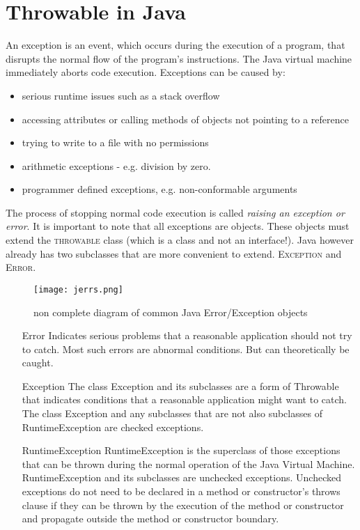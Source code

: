 \documentclass{scrartcl}
\title{\titleVar}
\begin{document}
\maketitle

\thispagestyle{fancy}

\section{Throwable in Java}

An exception is an event, which occurs during the execution of a program, that disrupts the normal flow of the program's instructions. The Java virtual machine immediately aborts code execution. Exceptions can be caused by:
\begin{itemize}
    \item serious runtime issues such as a stack overflow
    \item accessing attributes or calling methods of objects not pointing to a reference
    \item trying to write to a file with no permissions
    \item arithmetic exceptions - e.g. division by zero.
    \item programmer defined exceptions, e.g. non-conformable arguments
\end{itemize}

The process of stopping normal code execution is called  \textit{raising an exception or error}. It is important to note that all exceptions are objects. These objects must extend the \textsc{throwable} class  (which is a class and not an interface!). Java however already has two subclasses that are more convenient to extend. \textsc{Exception} and \textsc{Error}.


\begin{figure}[!h]
  \centering
\texttt{[image: jerrs.png]}
  \caption{non complete diagram of common Java Error/Exception objects}
\end{figure}
\begin{itemize}
    \item[Error] Indicates serious problems that a reasonable application should not try to catch. Most such errors are abnormal conditions. But can theoretically be caught.
    \item[Exception] The class Exception and its subclasses are a form of Throwable that indicates conditions that a reasonable application might want to catch.
 The class Exception and any subclasses that are not also subclasses of RuntimeException are checked exceptions.
    \item[RuntimeException] RuntimeException is the superclass of those exceptions that can be thrown during the normal operation of the Java Virtual Machine. RuntimeException and its subclasses are unchecked exceptions. Unchecked exceptions do not need to be declared in a method or constructor's throws clause if they can be thrown by the execution of the method or constructor and propagate outside the method or constructor boundary.
\end{itemize}
\end{document}

